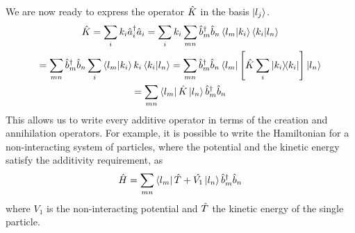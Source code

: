 We are now ready to express the operator $\hat{K}$ in the basis $\ket{l_j}$.
\begin{multline}
    \hat{K} =  \sum_i k_i  \hat{a}^\dagger_i\hat{a}_i
    = \sum_i k_i \sum_{mn} \hat{b}^\dagger_m\hat{b}_n \braket{l_m}{k_i}\braket{k_i}{l_n}
    \\ = \sum_{mn} \hat{b}^\dagger_m\hat{b}_n \sum_i \braket{l_m}{k_i} k_i \braket{k_i}{l_n}
    = \sum_{mn} \hat{b}^\dagger_m\hat{b}_n \bra{l_m} \left[ \hat{K} \sum_i \op{k_i} \right] \ket{l_n}
    \\= \sum_{mn}  \bra{l_m}\hat{K}\ket{l_n} \hat{b}^\dagger_m\hat{b}_n
\end{multline}
This allows us to write every additive operator in terms of the creation and annihilation operators. For example, it is possible to write the Hamiltonian for a non-interacting system of particles, where the potential and the kinetic energy satisfy the additivity requirement, as
\begin{equation} \label{eq:second_quantization}
    \hat{H} = \sum_{mn} \bra{l_m}\hat{T}+\hat{V_1}\ket{l_n} \hat{b}^\dagger_m\hat{b}_n
\end{equation}
where $V_1$ is the non-interacting potential and $\hat{T}$ the kinetic energy of the single particle.